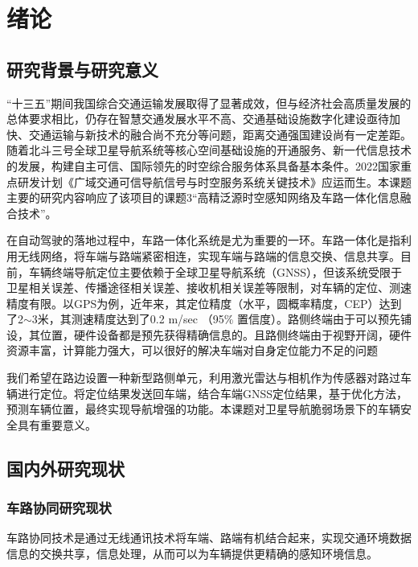 \newpage
{}
\section{绪论}

\subsection{研究背景与研究意义}

“十三五”期间我国综合交通运输发展取得了显著成效，但与经济社会高质量发展的总体要求相比，仍存在智慧交通发展水平不高、交通基础设施数字化建设亟待加快、交通运输与新技术的融合尚不充分等问题，距离交通强国建设尚有一定差距。随着北斗三号全球卫星导航系统等核心空间基础设施的开通服务、新一代信息技术的发展，构建自主可信、国际领先的时空综合服务体系具备基本条件。2022国家重点研发计划《广域交通可信导航信号与时空服务系统关键技术》应运而生。本课题主要的研究内容响应了该项目的课题3“高精泛源时空感知网络及车路一体化信息融合技术”。

在自动驾驶的落地过程中，车路一体化系统是尤为重要的一环。车路一体化是指利用无线网络，将车端与路端紧密相连，实现车端与路端的信息交换、信息共享。目前，车辆终端导航定位主要依赖于全球卫星导航系统（GNSS），但该系统受限于卫星相关误差、传播途径相关误差、接收机相关误差等限制，对车辆的定位、测速精度有限。以GPS为例，近年来，其定位精度（水平，圆概率精度，CEP）达到了2$\sim$3米，其测速精度达到了0.2 m/sec （95\% 置信度）。路侧终端由于可以预先铺设，其位置，硬件设备都是预先获得精确信息的。且路侧终端由于视野开阔，硬件资源丰富，计算能力强大，可以很好的解决车端对自身定位能力不足的问题

我们希望在路边设置一种新型路侧单元，利用激光雷达与相机作为传感器对路过车辆进行定位。将定位结果发送回车端，结合车端GNSS定位结果，基于优化方法，预测车辆位置，最终实现导航增强的功能。本课题对卫星导航脆弱场景下的车辆安全具有重要意义。

\subsection{国内外研究现状}

\subsubsection{车路协同研究现状}

车路协同技术是通过无线通讯技术将车端、路端有机结合起来，实现交通环境数据信息的交换共享，信息处理，从而可以为车辆提供更精确的感知环境信息。

